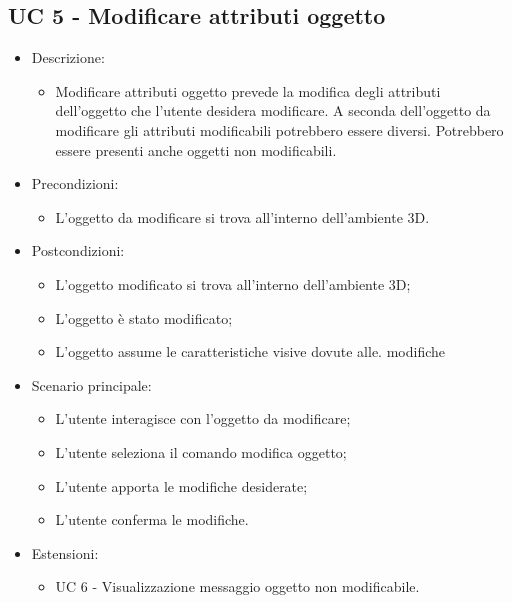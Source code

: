 \subsection{UC 5 - Modificare attributi oggetto}
\begin{itemize}

	\item Descrizione:
	\begin{itemize}
		\item Modificare attributi oggetto prevede la modifica degli attributi dell'oggetto che l'utente desidera modificare.
\newline A seconda dell'oggetto da modificare gli attributi modificabili potrebbero essere diversi.
\newline Potrebbero essere presenti anche oggetti non modificabili.
	\end{itemize}
	
	\item Precondizioni:
	\begin{itemize}
		\item L'oggetto da modificare si trova all'interno dell'ambiente 3D.
	\end{itemize}
	
	\item Postcondizioni:
	\begin{itemize}
		\item L'oggetto modificato si trova all'interno dell'ambiente 3D;
		\item L'oggetto è stato modificato;
		\item L'oggetto assume le caratteristiche visive dovute alle. modifiche
	\end{itemize}
	
	\item Scenario principale:
	\begin{itemize}
		\item L'utente interagisce con l'oggetto da modificare;
		\item L'utente seleziona il comando modifica oggetto;
		\item L'utente apporta le modifiche desiderate;
		\item L'utente conferma le modifiche.
	\end{itemize}
	
	\item Estensioni:
	\begin{itemize}
		\item UC 6 - Visualizzazione messaggio oggetto non modificabile.
	\end{itemize}
	
\end{itemize}

